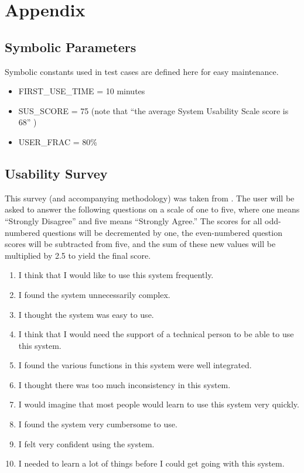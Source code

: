 \documentclass[12pt, titlepage]{article}
\begin{document}

\newpage





\newpage

\section{Appendix}

\subsection{Symbolic Parameters}

Symbolic constants used in test cases are defined here for easy
maintenance.

\begin{itemize}
  \item FIRST\_USE\_TIME = 10 minutes
  \item SUS\_SCORE = 75 (note that ``the average System Usability Scale score
        is 68'' \cite{thomas_how_2015})
  \item USER\_FRAC = 80\%
\end{itemize}

\subsection{Usability Survey} \label{sec_usableSurvey}

This survey (and accompanying methodology) was taken from
\cite{thomas_how_2015}. The user will be asked to
answer the following questions on a scale of one to five, where one means
``Strongly Disagree'' and five means ``Strongly Agree.'' The scores for all
odd-numbered questions will be decremented by one, the even-numbered question
scores will be subtracted from five, and the sum of these new values will be
multiplied by 2.5 to yield the final score.

\begin{enumerate}
  \item I think that I would like to use this system frequently.
  \item I found the system unnecessarily complex.
  \item I thought the system was easy to use.
  \item I think that I would need the support of a technical person to be able
        to use this system.
  \item I found the various functions in this system were well integrated.
  \item I thought there was too much inconsistency in this system.
  \item I would imagine that most people would learn to use this system very
        quickly.
  \item I found the system very cumbersome to use.
  \item I felt very confident using the system.
  \item I needed to learn a lot of things before I could get going with this
        system.
\end{enumerate}
\end{document}
